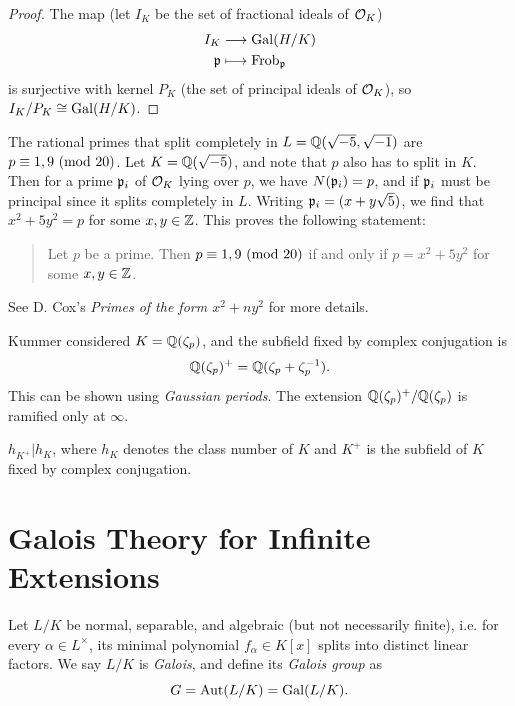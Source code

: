 \begin{proof}
  The map (let $I_K$ be the set of fractional
  ideals of $\mathcal{O}_K$)
  \begin{align*}
    I_K &\longrightarrow \operatorname{Gal}(H / K) \\
    \mathfrak{p} &\longmapsto \operatorname{Frob}_{\mathfrak{p}}
  \end{align*}
  is surjective with kernel $P_K$ (the set of
  principal ideals of $\mathcal{O}_K$), so
  $I_K / P_K \cong \operatorname{Gal}(H / K)$.
\end{proof}

\begin{example}
  The rational primes that split completely in
  $L = \mathbb{Q}(\sqrt{-5}, \sqrt{-1})$ are
  $p \equiv 1, 9 \ (\mathrm{mod}\ 20)$. Let
  $K = \mathbb{Q}(\sqrt{-5})$, and note that $p$
  also has to split in $K$. Then for a prime
  $\mathfrak{p}_i$ of $\mathcal{O}_K$ lying over $p$, we have
  $N(\mathfrak{p}_i) = p$, and if $\mathfrak{p}_i$ must be
  principal since it splits completely in
  $L$. Writing $\mathfrak{p}_i = (x + y \sqrt{5})$,
  we find that $x^2 + 5y^2 = p$ for some $x, y \in \mathbb{Z}$.
  This proves the following statement:
  \begin{quote}
    Let $p$ be a prime. Then
    $p \equiv 1, 9 \ (\mathrm{mod}\ 20)$ if and only if
    $p = x^2 + 5y^2$ for some $x, y \in \mathbb{Z}$.
  \end{quote}
  See D. Cox's \emph{Primes of the form $x^2 + ny^2$} for
  more details.
\end{example}

\begin{remark}
  Kummer considered $K = \mathbb{Q}(\zeta_p)$, and
  the subfield fixed by complex conjugation is
  \[
    \mathbb{Q}(\zeta_p)^+ = \mathbb{Q}(\zeta_p + \zeta_p^{-1}).
  \]
  This can be shown using \emph{Gaussian periods}.
  The extension $\mathbb{Q}(\zeta_p)^+ / \mathbb{Q}(\zeta_p)$ is
  ramified only at $\infty$.
\end{remark}

\begin{theorem}[Kummer]
  $h_{K^+} | h_K$, where $h_K$ denotes the
  class number of $K$ and $K^+$ is the
  subfield of $K$ fixed by complex
  conjugation.
\end{theorem}

\section{Galois Theory for Infinite Extensions}

\begin{definition}
  Let $L / K$ be normal, separable, and
  algebraic (but not necessarily finite), i.e.
  for every $\alpha \in L^\times$, its
  minimal polynomial $f_\alpha \in K[x]$
  splits into distinct linear
  factors. We say $L / K$ is \emph{Galois}, and
  define its \emph{Galois group} as
  \[
    G = \operatorname{Aut}(L / K) = \operatorname{Gal}(L / K).
  \]
\end{definition}

